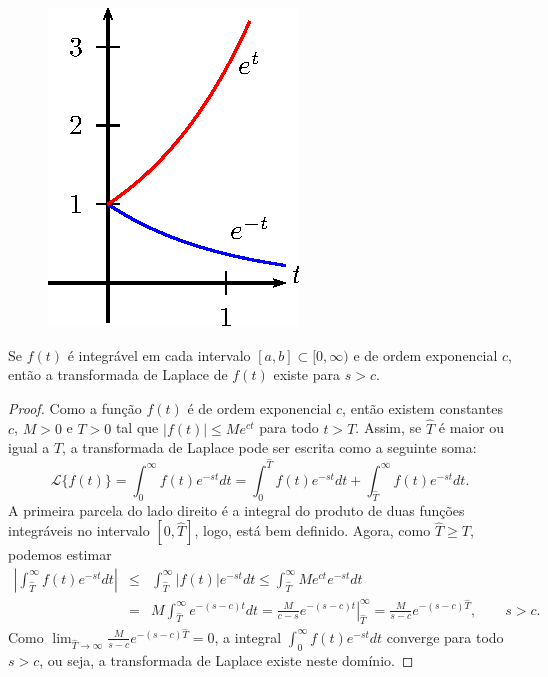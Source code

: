 \begin{ex}
\begin{figure}[!ht]
\begin{center}
\includegraphics{cap_definicao/pics/figura_3}\end{center}
\caption{\label{ordem_exp}}
\end{figure}
\end{ex}
\begin{teo}\label{ordem_exp_exist} Se $f(t)$ é integrável em cada intervalo $[a,b]\subset[0,\infty)$ e de ordem exponencial $c$, então a transformada de Laplace de $f(t)$ existe para $s>c$.
\end{teo}
\begin{proof}Como a função $f(t)$ é de ordem exponencial $c$, então existem constantes $c$, $M>0$ e $T>0$ tal que $|f(t)|\leq M e^{ct}$ para todo $t>T$. Assim, se $\hat{T}$ é maior ou igual a $T$, a transformada de Laplace  pode ser escrita como a seguinte soma:
\begin{equation}
\mathcal{L}\{f(t)\}=\int_0^\infty f(t)e^{-st}dt=\int_0^{\hat{T}} f(t)e^{-st}dt+\int_{\hat{T}}^\infty f(t)e^{-st}dt.
\end{equation}
A primeira parcela do lado direito é a integral do produto de duas funções integráveis no intervalo $[0, \hat{T}]$, logo, está bem definido. Agora, como $\hat{T}\geq T$, podemos estimar
\begin{eqnarray*}
\left|\int_{\hat{T}}^\infty f(t)e^{-st}dt\right|&\leq& \int_{\hat{T}}^\infty \left|f(t)\right|e^{-st}dt\leq \int_{\hat{T}}^\infty M e^{ct}e^{-st}dt\\
&=&M \int_{\hat{T}}^\infty e^{-(s-c)t}dt
=\left.\frac{M}{c-s} e^{-(s-c)t}\right|_{\hat{T}}^\infty =\frac{M}{s-c}e^{-(s-c)\hat{T}} ,\qquad s>c.
\end{eqnarray*}
Como $\lim_{\hat{T}\to \infty} \frac{M}{s-c}e^{-(s-c)\hat{T}}=0$, a integral $\int_0^\infty f(t)e^{-st}dt$ converge para todo $s>c$, ou seja, a transformada de Laplace existe neste domínio.
\end{proof}
